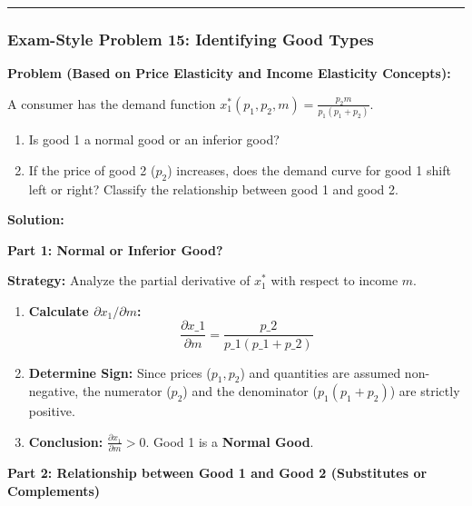 \documentclass{article}
\begin{document}
\vspace{5pt}\noindent\rule{\linewidth}{0.4pt}\vspace{5pt}

\subsubsection*{Exam-Style Problem 15: Identifying Good Types}

\textbf{Problem (Based on Price Elasticity and Income Elasticity Concepts):}

A consumer has the demand function $x_1^*(p_1, p_2, m) = \frac{p_2 m}{p_1(p_1 + p_2)}$.
\begin{enumerate}
    \item Is good 1 a normal good or an inferior good?
    \item If the price of good 2 ($p_2$) increases, does the demand curve for good 1 shift left or right? Classify the relationship between good 1 and good 2.
\end{enumerate}

\textbf{Solution:}

\textbf{Part 1: Normal or Inferior Good?}

\textbf{Strategy:} Analyze the partial derivative of $x_1^*$ with respect to income $m$.
\begin{enumerate}
    \item \textbf{Calculate $\partial x_1 / \partial m$:}
    \[ \frac{\partial x\_1}{\partial m} = \frac{p\_2}{p\_1(p\_1 + p\_2)} \]
    \item \textbf{Determine Sign:} Since prices ($p_1, p_2$) and quantities are assumed non-negative, the numerator ($p_2$) and the denominator ($p_1(p_1 + p_2)$) are strictly positive.
    \item \textbf{Conclusion:} $\frac{\partial x_1}{\partial m} > 0$. Good 1 is a \textbf{Normal Good}.
\end{enumerate}

\textbf{Part 2: Relationship between Good 1 and Good 2 (Substitutes or Complements)}
\end{document}
